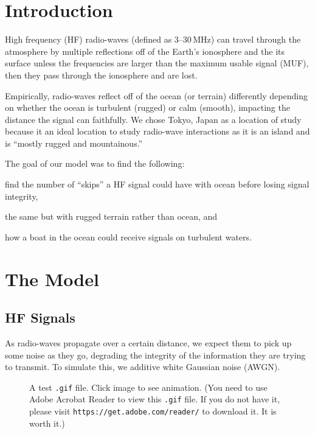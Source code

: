 \documentclass[11pt, twocolumn]{article}
\numberwithin{equation}{section}
\begin{document}
\section{Introduction} 
\label{sec: intro} 

High frequency (HF) radio-waves (defined as 3--30\,\si{\mega\hertz}) can travel through the atmosphere by multiple reflections off of the Earth's ionosphere and the its surface unless the frequencies are larger than the maximum usable signal (MUF), then they pass through the ionosphere and are lost.\cite{mcm_statement} 

Empirically, radio-waves reflect off of the ocean (or terrain) differently depending on whether the ocean is turbulent (rugged) or calm (smooth), impacting the distance the signal can faithfully.\cite{mcm_statement} We chose Tokyo, Japan as a location of study because it an ideal location to study radio-wave interactions as it is an island and is ``mostly rugged and mountainous.''\cite{factbook2010world}

The goal of our model was to find the following: 
\begin{enumerate*}[(1)]
    \item find the number of ``skips'' a HF signal could have with ocean before losing signal integrity, 
    \item the same but with rugged terrain rather than ocean, and
    \item how a boat in the ocean could receive signals on turbulent waters.
\end{enumerate*}


\section{The Model} %
\label{sec:model}

\subsection{HF Signals} %
\label{sub:radiowaves}

As radio-waves propagate over a certain distance, we expect them to pick up some noise as they go, degrading the integrity of the information they are trying to transmit. To simulate this, we additive white Gaussian noise (AWGN).\cite{shannon1984communication,kailath1968innovations}
 \begin{figure}
     \begin{center}
     \end{center}
     \caption{A test \texttt{.gif} file. Click image to see animation. (You need to use Adobe Acrobat Reader to view this \texttt{.gif} file. If you do not have it, please visit \texttt{https://get.adobe.com/reader/} to download it. It is worth it.)}
 \end{figure}
\end{document}
